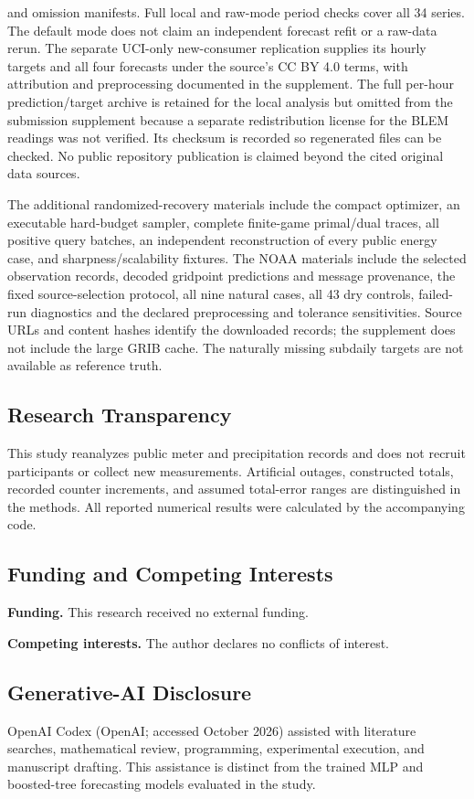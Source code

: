 \documentclass[12pt]{article}
\begin{document}
and omission manifests. Full local and raw-mode period checks cover all
34 series. The default mode does not claim an independent forecast refit
or a raw-data rerun.
The separate UCI-only new-consumer replication supplies its hourly targets
and all four forecasts under the source's CC BY 4.0 terms, with attribution
and preprocessing documented in the supplement.
The full
per-hour prediction/target archive is retained for the local analysis but
omitted from the submission supplement because a separate redistribution
license for the BLEM readings was not verified. Its checksum is recorded
so regenerated files can be checked. No public
repository publication is claimed beyond the cited original data sources.


The additional randomized-recovery materials include the compact optimizer,
an executable hard-budget sampler, complete finite-game primal/dual traces,
all positive query batches, an independent reconstruction of every public
energy case, and sharpness/scalability fixtures. The NOAA materials include
the selected observation records, decoded gridpoint predictions and message
provenance, the fixed source-selection protocol, all nine natural cases,
all 43 dry controls, failed-run diagnostics and the declared preprocessing
and tolerance sensitivities. Source URLs and content hashes identify the
downloaded records; the supplement does not include the large GRIB cache.
The naturally missing subdaily targets are not available as reference truth.

\subsection*{Research Transparency}
This study reanalyzes public meter and precipitation records and does not recruit participants
or collect new measurements. Artificial outages, constructed totals,
recorded counter increments, and assumed total-error ranges are distinguished
in the methods. All reported numerical results were calculated by the
accompanying code.

\subsection*{Funding and Competing Interests}
\textbf{Funding.} This research received no external funding.

\textbf{Competing interests.} The author declares no conflicts of interest.

\subsection*{Generative-AI Disclosure}
OpenAI Codex (OpenAI; accessed October 2026) assisted with literature
searches, mathematical review, programming, experimental execution, and
manuscript drafting. This assistance is distinct from the trained MLP and
boosted-tree forecasting models evaluated in the study.
\end{document}
